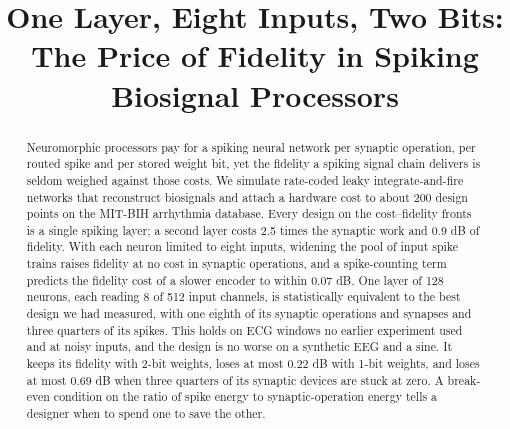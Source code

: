 \documentclass[conference]{IEEEtran}
\begin{document}
\title{One Layer, Eight Inputs, Two Bits: The Price of Fidelity in Spiking
Biosignal Processors}

\author{
\and
{}
\and
{}
}

\maketitle

\begin{abstract}
Neuromorphic processors pay for a spiking neural network per synaptic
operation, per routed spike and per stored weight bit, yet the fidelity a
spiking signal chain delivers is seldom weighed against those costs. We
simulate rate-coded leaky integrate-and-fire networks that reconstruct
biosignals and attach a hardware cost to about 200 design points on the
MIT-BIH arrhythmia database. Every design on the cost--fidelity fronts is a
single spiking layer; a second layer costs 2.5 times the synaptic work and
0.9 dB of fidelity. With each neuron limited to eight inputs, widening the pool
of input spike trains raises fidelity at no cost in synaptic operations, and a
spike-counting term predicts the fidelity cost of a slower encoder to within
0.07 dB. One layer of 128 neurons, each reading 8 of 512 input channels, is
statistically equivalent to the best design we had measured, with one eighth
of its synaptic operations and synapses and three quarters of its spikes. This
holds on ECG windows no earlier experiment used and at noisy inputs, and the
design is no worse on a synthetic EEG and a sine. It keeps its fidelity with
2-bit weights, loses at most 0.22 dB with 1-bit weights, and loses at most
0.69 dB when three quarters of its synaptic devices are stuck at zero. A
break-even condition on the ratio of spike energy to synaptic-operation energy
tells a designer when to spend one to save the other.
\end{abstract}
\end{document}
